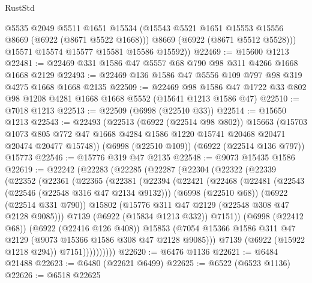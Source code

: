 \begin{lexlean}{RustStd}
\begin{coremodule}
          @5535
          @2049
          @5511
          @1651
          @15534
          (@15543 @5521 @1651 @15553 @15556 @8669 (@6922 (@8671 @5522 @1668)))
          @8669
          (@6922 (@8671 @5512 @5528)))
        @15571
        @15574
        @15577
        @15581
        @15586
        @15592))
@22469 := @15600 @1213
@22481 := @22469 @331 @1586 @47 @5557 @68 @790 @98 @311 @4266 @1668 @1668 @2129
@22493 := @22469 @136 @1586 @47 @5556 @109 @797 @98 @319 @4275 @1668 @1668 @2135
@22509 := @22469
    @98
    @1586
    @47
    @1722
    @33
    @802
    @98
    @1208
    @4281
    @1668
    @1668
    @5552
    (@15641 @1213 @1586 @47)
@22510 := @7018 @1213
@22513 := @22509 (@6998 (@22510 @33))
@22514 := @15650 @1213
@22543 := @22493
    (@22513
      (@6922 (@22514 @98 @802))
      @15663
      (@15703
        @1073
        @805
        @772
        @47
        @1668
        @4284
        @1586
        @1220
        @15741
        @20468
        @20471
        @20474
        @20477
        @15748))
    (@6998 (@22510 @109))
    (@6922 (@22514 @136 @797))
    @15773
@22546 := @15776 @319 @47 @2135
@22548 := @9073 @15435 @1586
@22619 := @22242
    (@22283
      (@22285
        (@22287
          (@22304
            (@22322
              (@22339
                (@22352
                  (@22361
                    (@22365
                      (@22381
                        (@22394
                          (@22421
                            (@22468
                              (@22481
                                (@22543 (@22546 (@22548 @316 @47 @2134 @9132)))
                                (@6998 (@22510 @68))
                                (@6922 (@22514 @331 @790))
                                @15802
                                (@15776 @311 @47 @2129 (@22548 @308 @47 @2128 @9085)))
                              @7139
                              (@6922 (@15834 @1213 @332))
                              @7151))
                          (@6998 (@22412 @68))
                          (@6922 (@22416 @126 @408))
                          @15853
                          (@7054
                            @15366
                            @1586
                            @311
                            @47
                            @2129
                            (@9073 @15366 @1586 @308 @47 @2128 @9085)))
                        @7139
                        (@6922 (@15922 @1218 @294))
                        @7151))))))))))
@22620 := @6476 @1136
@22621 := @6484 @21488
@22623 := @6480 (@22621 @6499)
@22625 := @6522 (@6523 @1136)
@22626 := @6518 @22625

\end{coremodule}
\end{lexlean}

